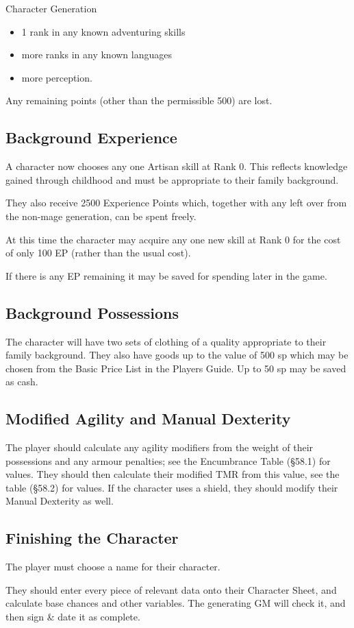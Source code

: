 \begin{Chapter}{Character Generation}
\begin{enumerate}
  \begin{itemize}
    \item 1 rank in any known adventuring skills  
    \item more ranks in any known languages
    \item more perception. 
  \end{itemize}

\end{enumerate}

Any remaining points (other than the permissible 500) are lost.

\subsection{Background Experience}

A character now chooses any one Artisan skill at Rank 0.  This
reflects knowledge gained through childhood and must be appropriate to
their family background.

They also receive 2500 Experience Points which, together with any left
over from the non-mage generation, can be spent freely.

At this time the character may acquire any one new skill at Rank 0 for
the cost of only 100 EP (rather than the usual cost).

If there is any EP remaining it may be saved for spending later in the
game.

\subsection{Background Possessions}

The character will have two sets of clothing of a quality appropriate
to their family background.  They also have goods up to the value of
500 sp which may be chosen from the Basic Price List in the Players
Guide.  Up to 50 sp may be saved as cash.

\subsection{Modified Agility and Manual Dexterity}

The player should calculate any agility modifiers from the weight of
their possessions and any armour penalties; see the Encumbrance Table
(\S58.1) for values.  They should then calculate their modified TMR
from this value, see the table (\S58.2) for values.  If the character
uses a shield, they should modify their Manual Dexterity as well.

\subsection{Finishing the Character}

The player must choose a name for their character. 

They should enter every piece of relevant data onto their Character
Sheet, and calculate base chances and other variables. The generating
GM will check it, and then sign \& date it as complete.

\end{Chapter}
